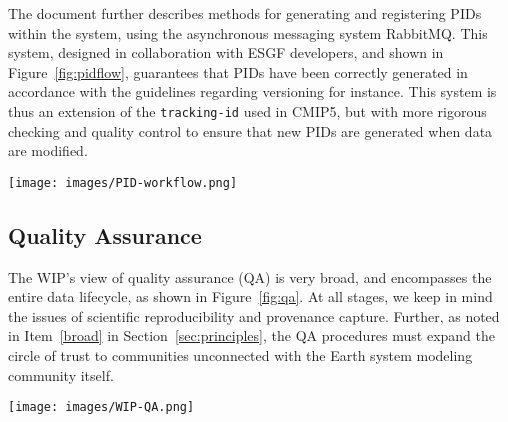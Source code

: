 \documentclass[gmd,manuscript]{copernicus}
\newcommand{\figref}[1] {\mbox{Figure   \ref{fig:#1}}}
\newcommand{\secref}[1] {\mbox{Section  \ref{sec:#1}}}
\begin{document}
The document further describes methods for generating and registering
PIDs within the system, using the asynchronous messaging system
RabbitMQ. This system, designed in collaboration with ESGF developers,
and shown in \figref{pidflow}, guarantees that PIDs have been
correctly generated in accordance with the guidelines regarding
versioning for instance. This system is thus an extension of the
\texttt{tracking-id} used in CMIP5, but with more rigorous checking
and quality control to ensure that new PIDs are generated when data
are modified.

\begin{figure*}
  \begin{center}
    \texttt{[image: images/PID-workflow.png]}
  \end{center}
  \caption{PID workflow, showing the generation and registry of PIDs,
    with checkpoints where compliance is assured. Figure courtesy
    Tobias Weigel.}
  \label{fig:pidflow}
\end{figure*}

\subsection{Quality Assurance}
\label{sec:qa}

The WIP's view of quality assurance (QA) is very broad, and
encompasses the entire data lifecycle, as shown in \figref{qa}. At all
stages, we keep in mind the issues of scientific reproducibility and
provenance capture. Further, as noted in Item~\ref{broad} in
\secref{principles}, the QA procedures must expand the circle of trust
to communities unconnected with the Earth system modeling community
itself.


\begin{figure*}
  \begin{center}
    \texttt{[image: images/WIP-QA.png]}
  \end{center}
  \caption{Schematic of the phases of quality assurance, with earlier
    stages in the hands of modeling centres (left), and more formal
    long-term data curation stages at right. Quality assurance is
    applied both to the data (D, above) as well as the metadata (M)
    describing the data. Figure courtesy Martina Stockhause, drawn
    from the WIP's Quality Assurance position paper.}
  \label{fig:qa}
\end{figure*}
\end{document}

